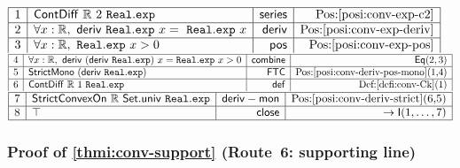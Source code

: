 \documentclass[11pt,reqno]{amsart}
\theoremstyle{redplain}
\numberwithin{equation}{section}
\begin{document}
\begin{center}
$%
\begin{array}{|c|l|r|r|}
\hline
1 & \mathsf{ContDiff}\ \mathbb{R}\ 2\ \mathtt{Real.exp} & \mathsf{series} & %
\mbox{Pos:\ref{posi:conv-exp-c2}} \\ \hline
2 & \forall x:\mathbb{R},\ \mathsf{deriv}\ \mathtt{Real.exp}\ x=\mathtt{\
Real.exp}\ x & \mathsf{deriv} & \mbox{Pos:\ref{posi:conv-exp-deriv}} \\ 
\hline
3 & \forall x:\mathbb{R},\ \mathtt{Real.exp}\ x>0 & \mathsf{pos} & %
\mbox{Pos:\ref{posi:conv-exp-pos}}%
\end{array}
$ \noindent $%
\begin{array}{|c|l|r|r|}
\hline
4 & \forall x:\mathbb{R},\ \mathsf{deriv}\ (\mathsf{deriv}\ \mathtt{Real.exp}
)\ x=\mathtt{Real.exp}\ x>0 & \mathsf{combine} & \mathsf{Eq}(2,3) \\ \hline
5 & \mathsf{StrictMono}\ (\mathsf{deriv}\ \mathtt{Real.exp}) & \mathsf{FTC}
& \mbox{Pos:\ref{posi:conv-deriv-pos-mono}(1,4)} \\ \hline
6 & \mathsf{ContDiff}\ \mathbb{R}\ 1\ \mathtt{Real.exp} & \mathsf{def} & %
\mbox{Def:\ref{defi:conv-Ck}(1)}%
\end{array}
$ \noindent $%
\begin{array}{|c|l|r|r|}
\hline
7 & \mathsf{StrictConvexOn}\ \mathbb{R}\ \mathsf{Set.univ}\ \mathtt{Real.exp}
& \mathsf{deriv-mon} & \mbox{Pos:\ref{posi:conv-deriv-strict}(6,5)} \\ \hline
8 & \top & \mathsf{close} & \rightarrow \mathsf{I}(1,\dots ,7) \\ \hline
\end{array}
$
\end{center}

\subsubsection*{Proof of \autoref{thmi:conv-support} (Route~6: supporting
line)}
\end{document}

